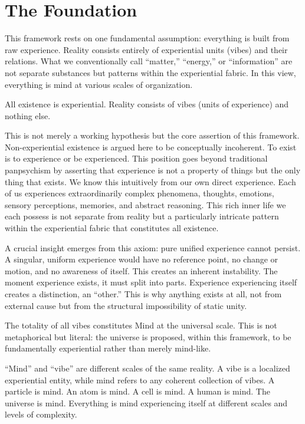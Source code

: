 \section{The Foundation}

This framework rests on one fundamental assumption: everything is built from raw experience. Reality consists entirely of experiential units (vibes) and their relations. What we conventionally call ``matter,'' ``energy,'' or ``information'' are not separate substances but patterns within the experiential fabric. In this view, everything is mind at various scales of organization.

\begin{axiom}
All existence is experiential. Reality consists of vibes (units of experience) and nothing else.
\end{axiom}

This is not merely a working hypothesis but the core assertion of this framework. Non-experiential existence is argued here to be conceptually incoherent. To exist is to experience or be experienced. This position goes beyond traditional panpsychism by asserting that experience is not a property of things but the only thing that exists. We know this intuitively from our own direct experience. Each of us experiences extraordinarily complex phenomena, thoughts, emotions, sensory perceptions, memories, and abstract reasoning. This rich inner life we each possess is not separate from reality but a particularly intricate pattern within the experiential fabric that constitutes all existence.

A crucial insight emerges from this axiom: pure unified experience cannot persist. A singular, uniform experience would have no reference point, no change or motion, and no awareness of itself. This creates an inherent instability. The moment experience exists, it must split into parts. Experience experiencing itself creates a distinction, an ``other.'' This is why anything exists at all, not from external cause but from the structural impossibility of static unity.

The totality of all vibes constitutes Mind at the universal scale. This is not metaphorical but literal: the universe is proposed, within this framework, to be fundamentally experiential rather than merely mind-like.

``Mind'' and ``vibe'' are different scales of the same reality. A vibe is a localized experiential entity, while mind refers to any coherent collection of vibes. A particle is mind. An atom is mind. A cell is mind. A human is mind. The universe is mind. Everything is mind experiencing itself at different scales and levels of complexity.


